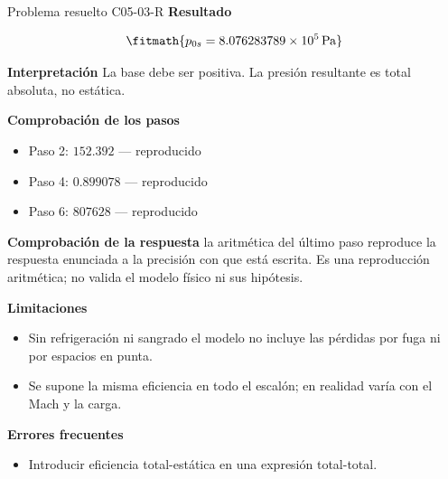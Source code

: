 \documentclass[10pt,openany]{book}
\begin{document}
\begin{studiumworked}{Problema resuelto C05-03-R}
\noindent\textbf{Resultado}

\[
\fitmath{p_{0s}=8.076283789\times10^{5}\,\mathrm{Pa}}
\]

\noindent\textbf{Interpretación}
La base debe ser positiva. La presión resultante es total absoluta, no estática.

\noindent\textbf{Comprobación de los pasos}
\begin{itemize}
\item Paso 2: $152.392$ — reproducido
\item Paso 4: $0.899078$ — reproducido
\item Paso 6: $807628$ — reproducido
\end{itemize}

\noindent\textbf{Comprobación de la respuesta} la aritmética del último paso reproduce la respuesta enunciada a la precisión con que está escrita. Es una reproducción aritmética; no valida el modelo físico ni sus hipótesis.

\noindent\textbf{Limitaciones}
\begin{itemize}
\item Sin refrigeración ni sangrado el modelo no incluye las pérdidas por fuga ni por espacios en punta.
\item Se supone la misma eficiencia en todo el escalón; en realidad varía con el Mach y la carga.
\end{itemize}

\noindent\textbf{Errores frecuentes}
\begin{itemize}
\item Introducir eficiencia total-estática en una expresión total-total.
\end{itemize}
\end{studiumworked}
\end{document}
